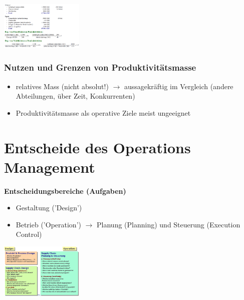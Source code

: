 \documentclass{report}
\newenvironment{Figure}
	{\par\medskip\noindent\minipage{\linewidth}}
	{\endminipage\par\medskip}
\theoremstyle{definition}
\theoremstyle{example}
\begin{document}
\begin{Figure}
\centering
\includegraphics[width=150px]{img/ProduktivitaetNumBsp.png}
	\label{fig:Numerisches Beispiel für die Produktivität}
\end{Figure}

      \subsubsection{Nutzen und Grenzen von Produktivitätsmasse}
\begin{itemize}
   \item relatives Mass (nicht absolut!) $\rightarrow$ aussagekräftig im Vergleich (andere Abteilungen, über Zeit, Konkurrenten)
   \item Produktivitätsmasse als operative Ziele meist ungeeignet
\end{itemize}






\section{Entscheide des Operations Management}
\textbf{Entscheidungsbereiche (Aufgaben)}
\begin{itemize}
   \item Gestaltung ('Design')
   \item Betrieb ('Operation') $\rightarrow$ Planung (Planning) und Steuerung (Execution Control)
\end{itemize}

\begin{Figure}
\centering
\includegraphics[width=150px]{img/OMEntscheidungsbereiche.png}
	\label{fig:Entscheidungsbereiche im OM}
\end{Figure}
\end{document}
